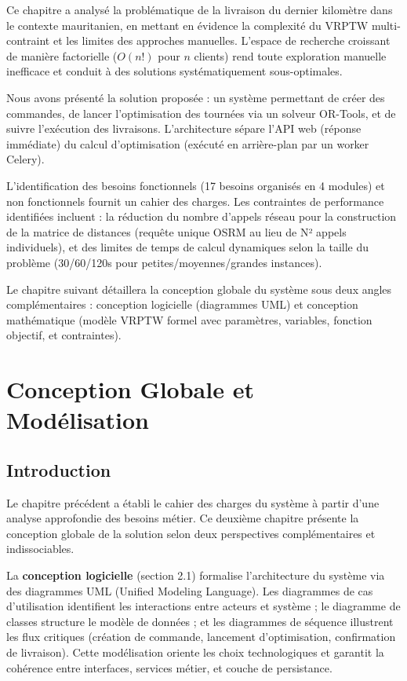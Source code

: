 \documentclass[12pt,a4paper]{report}
\begin{document}
Ce chapitre a analysé la problématique de la livraison du dernier kilomètre dans le contexte mauritanien, en mettant en évidence la complexité du VRPTW multi-contraint et les limites des approches manuelles. L'espace de recherche croissant de manière factorielle ($O(n!)$ pour $n$ clients) rend toute exploration manuelle inefficace et conduit à des solutions systématiquement sous-optimales.

Nous avons présenté la solution proposée : un système permettant de créer des commandes, de lancer l'optimisation des tournées via un solveur OR-Tools, et de suivre l'exécution des livraisons. L'architecture sépare l'API web (réponse immédiate) du calcul d'optimisation (exécuté en arrière-plan par un worker Celery).

L'identification des besoins fonctionnels (17 besoins organisés en 4 modules) et non fonctionnels fournit un cahier des charges. Les contraintes de performance identifiées incluent : la réduction du nombre d'appels réseau pour la construction de la matrice de distances (requête unique OSRM au lieu de N² appels individuels), et des limites de temps de calcul dynamiques selon la taille du problème (30/60/120s pour petites/moyennes/grandes instances).

Le chapitre suivant détaillera la conception globale du système sous deux angles complémentaires : conception logicielle (diagrammes UML) et conception mathématique (modèle VRPTW formel avec paramètres, variables, fonction objectif, et contraintes).

\chapter{Conception Globale et Modélisation}

\section{Introduction}

Le chapitre précédent a établi le cahier des charges du système à partir d'une analyse approfondie des besoins métier. Ce deuxième chapitre présente la conception globale de la solution selon deux perspectives complémentaires et indissociables.

La \textbf{conception logicielle} (section 2.1) formalise l'architecture du système via des diagrammes UML (Unified Modeling Language). Les diagrammes de cas d'utilisation identifient les interactions entre acteurs et système ; le diagramme de classes structure le modèle de données ; et les diagrammes de séquence illustrent les flux critiques (création de commande, lancement d'optimisation, confirmation de livraison). Cette modélisation oriente les choix technologiques et garantit la cohérence entre interfaces, services métier, et couche de persistance.
\end{document}
